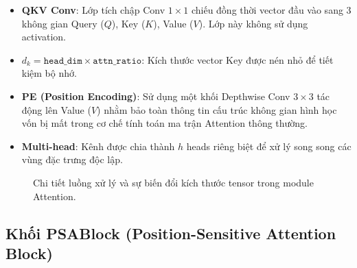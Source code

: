 \begin{itemize}
    \item \textbf{QKV Conv}: Lớp tích chập Conv $1\times1$ chiếu đồng thời vector đầu vào sang 3 không gian Query ($Q$), Key ($K$), Value ($V$). Lớp này không sử dụng activation.
    \item $d_k = \texttt{head\_dim} \times \texttt{attn\_ratio}$: Kích thước vector Key được nén nhỏ để tiết kiệm bộ nhớ.
    \item \textbf{PE (Position Encoding)}: Sử dụng một khối Depthwise Conv $3\times3$ tác động lên Value ($V$) nhằm bảo toàn thông tin cấu trúc không gian hình học vốn bị mất trong cơ chế tính toán ma trận Attention thông thường.
    \item \textbf{Multi-head}: Kênh được chia thành $h$ heads riêng biệt để xử lý song song các vùng đặc trưng độc lập.
\end{itemize}

\begin{figure}[H]
\centering
{}
\caption{Chi tiết luồng xử lý và sự biến đổi kích thước tensor trong module Attention.}
\label{fig:attention_flow}
\end{figure}

\subsection{Khối PSABlock (Position-Sensitive Attention Block)}
\label{subsec:psablock}

